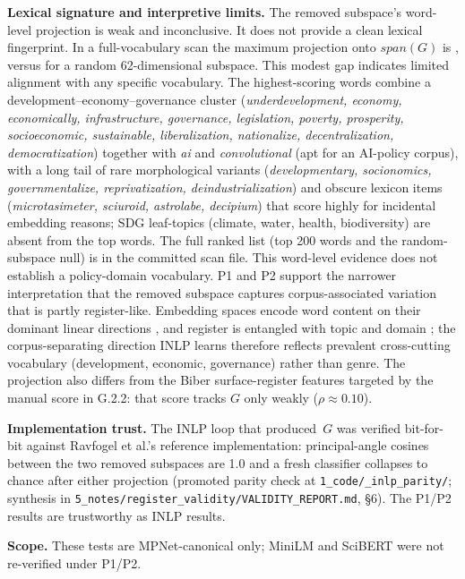 \documentclass[12pt,a4paper]{article}
\begin{document}
\textbf{Lexical signature and interpretive limits.}
The removed subspace's word-level projection is weak and inconclusive. It does not provide a clean lexical fingerprint. In a full-vocabulary scan the maximum projection onto $span(G)$ is \RegValPZeroBG{}, versus \RegValPZeroBRand{} for a random 62-dimensional subspace. This modest gap indicates limited alignment with any specific vocabulary. The highest-scoring words combine a development--economy--governance cluster (\emph{underdevelopment, economy, economically, infrastructure, governance, legislation, poverty, prosperity, socioeconomic, sustainable, liberalization, nationalize, decentralization, democratization}) together with \emph{ai} and \emph{convolutional} (apt for an AI-policy corpus), with a long tail of rare morphological variants (\emph{developmentary, socionomics, governmentalize, reprivatization, deindustrialization}) and obscure lexicon items (\emph{microtasimeter, sciuroid, astrolabe, decipium}) that score highly for incidental embedding reasons; SDG leaf-topics (climate, water, health, biodiversity) are absent from the top words. The full ranked list (top 200 words and the random-subspace null) is in the committed scan file. This word-level evidence does not establish a policy-domain vocabulary. P1 and P2 support the narrower interpretation that the removed subspace captures corpus-associated variation that is partly register-like. Embedding spaces encode word content on their dominant linear directions \parencite{conneau2018cramsinglevectorprobing, alain2018understandingintermediatelayersusing, ethayarajh2019contextual}, and register is entangled with topic and domain \parencite{Grieve2025, john2019disentangled}; the corpus-separating direction INLP learns therefore reflects prevalent cross-cutting vocabulary (development, economic, governance) rather than genre. The projection also differs from the Biber surface-register features targeted by the manual score in G.2.2: that score tracks $G$ only weakly ($\rho\approx0.10$).

\textbf{Implementation trust.}
The INLP loop that produced~$G$ was verified bit-for-bit against Ravfogel et al.'s reference implementation: principal-angle cosines between the two removed subspaces are 1.0 and a fresh classifier collapses to chance after either projection (promoted parity check at \texttt{1\_code/\_inlp\_parity/}; synthesis in \texttt{5\_notes/register\_validity/VALIDITY\_REPORT.md}, \S6). The P1/P2 results are trustworthy as INLP results.

\textbf{Scope.}
These tests are MPNet-canonical only; MiniLM and SciBERT were not re-verified under P1/P2.
\end{document}
